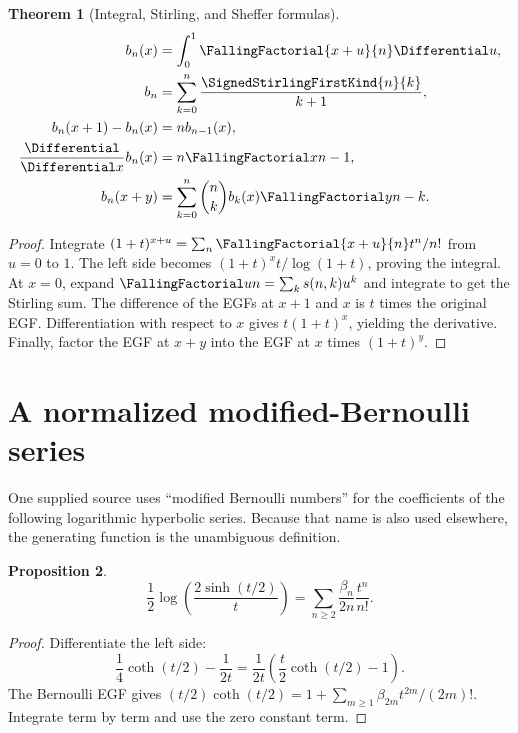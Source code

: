 \documentclass[11pt,a4paper,oneside,openany]{book}
\newtheorem{theorem}{Theorem}[chapter]
\newtheorem{proposition}[theorem]{Proposition}
\theoremstyle{definition}
\theoremstyle{remark}
\begin{document}
\begin{theorem}[Integral, Stirling, and Sheffer formulas]
\label{unif:thm-cauchy-polynomials}
\begin{align}
 b_n(x)&=\int_0^1\FallingFactorial{x+u}{n}\Differential u,
 \label{unif:eq-cauchy-integral}\\
 b_n&=\sum_{k=0}^{n}\frac{\SignedStirlingFirstKind{n}{k}}{k+1},
 \label{unif:eq-cauchy-stirling}\\
 b_n(x+1)-b_n(x)&=nb_{n-1}(x),
 \label{unif:eq-cauchy-difference}\\
 \frac{\Differential}{\Differential x}b_n(x)&=n\FallingFactorial x{n-1},
 \label{unif:eq-cauchy-derivative}\\
 b_n(x+y)&=\sum_{k=0}^{n}\binom nk b_k(x)\FallingFactorial y{n-k}.
 \label{unif:eq-cauchy-sheffer}
\end{align}
\end{theorem}
\begin{proof}
Integrate
$(1+t)^{x+u}=\sum_n\FallingFactorial{x+u}{n}t^n/n!$ from $u=0$ to $1$. The left side
becomes $(1+t)^xt/\log(1+t)$, proving the integral. At $x=0$, expand
$\FallingFactorial un=\sum_ks(n,k)u^k$ and integrate to get the Stirling sum. The
difference of the EGFs at $x+1$ and $x$ is $t$ times the original EGF.
Differentiation with respect to $x$ gives $t(1+t)^x$, yielding the derivative.
Finally, factor the EGF at $x+y$ into the EGF at $x$ times $(1+t)^y$.
\end{proof}

\section{A normalized modified-Bernoulli series}

One supplied source uses ``modified Bernoulli numbers'' for the coefficients
of the following logarithmic hyperbolic series. Because that name is also used
elsewhere, the generating function is the unambiguous definition.

\begin{proposition}
\begin{equation}\label{unif:eq-modified-bernoulli}
 \frac12\log\left(\frac{2\sinh(t/2)}{t}\right)
 =\sum_{n\ge2}\frac{\beta_n}{2n}\frac{t^n}{n!}.
\end{equation}
\end{proposition}
\begin{proof}
Differentiate the left side:
\[
 \frac14\coth(t/2)-\frac1{2t}
 =\frac1{2t}\left(\frac t2\coth(t/2)-1\right).
\]
The Bernoulli EGF gives
$(t/2)\coth(t/2)=1+\sum_{m\ge1}\beta_{2m}t^{2m}/(2m)!$.
Integrate term by term and use the zero constant term.
\end{proof}
\end{document}
